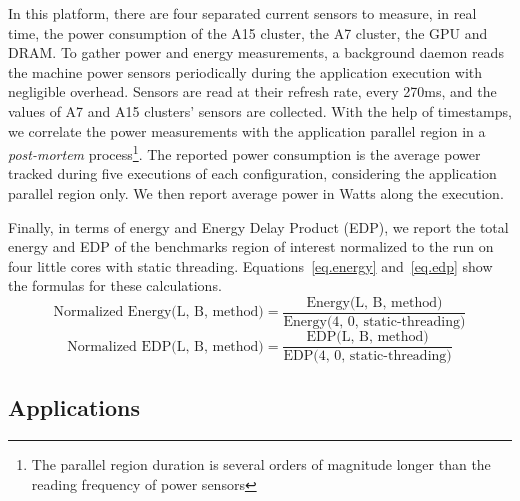 
In this platform, there are four separated current sensors to measure, in real time, the power consumption of the A15 cluster, the A7 cluster, the GPU and DRAM. 
To gather power and energy measurements, a background daemon reads the machine power 
sensors periodically during the application execution with negligible overhead. Sensors are read 
at their refresh rate, every 270ms, and the values of A7 and A15 clusters' sensors are collected.
With the help of timestamps, we 
correlate the power measurements with the application parallel region in a  
\emph{post-mortem} process\footnote{The parallel region duration is several orders of magnitude 
longer than the reading frequency of power sensors}. The reported power consumption is the 
average power tracked during five executions of each configuration, considering 
the application parallel region only. We then report average power in Watts along the 
execution. 

Finally, in terms of energy and Energy Delay Product (EDP), we report the total energy and EDP of 
the benchmarks region of interest normalized to the run on four 
little cores with static threading.
Equations~\ref{eq.energy} and~\ref{eq.edp} show the formulas for these calculations.
\begingroup\makeatletter\def\f@size{8}\check@mathfonts
\begin{equation}
  \text{Normalized Energy(L, B, method)} = \frac{\text{Energy(L, B, method)}}{\text{Energy(4, 0, static-threading)}}
  \label{eq.energy}
\end{equation}
\begin{equation}
  \text{Normalized EDP(L, B, method)} = \frac{\text{EDP(L, B, method)}}{\text{EDP(4, 0, static-threading)}}
  \label{eq.edp}
\end{equation}
\endgroup




\subsection{Applications}
\label{sec:parsec}

